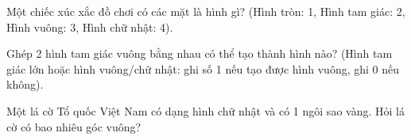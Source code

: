 \begin{ex}
Một chiếc xúc xắc đồ chơi có các mặt là hình gì? (Hình tròn: 1, Hình tam giác: 2, Hình vuông: 3, Hình chữ nhật: 4).
\end{ex}

\begin{ex}
Ghép 2 hình tam giác vuông bằng nhau có thể tạo thành hình nào? (Hình tam giác lớn hoặc hình vuông/chữ nhật: ghi số 1 nếu tạo được hình vuông, ghi 0 nếu không).
\end{ex}

\begin{ex}
Một lá cờ Tổ quốc Việt Nam có dạng hình chữ nhật và có 1 ngôi sao vàng. Hỏi lá cờ có bao nhiêu góc vuông?
\end{ex}

